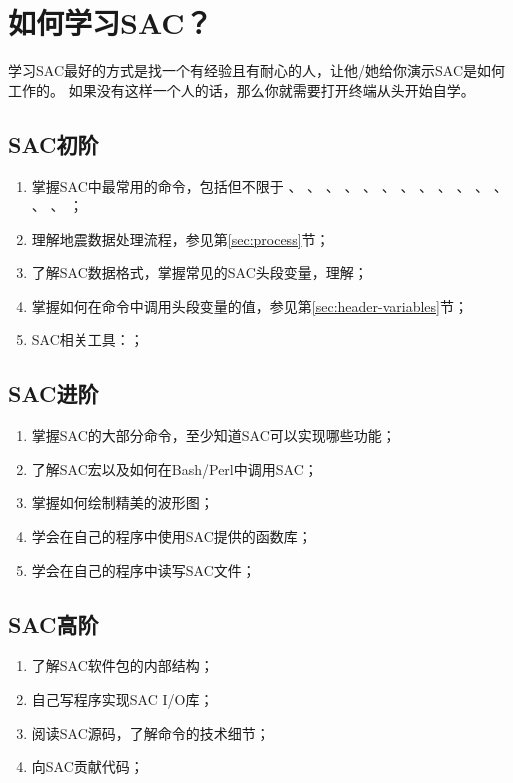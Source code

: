\section{如何学习SAC？}
学习SAC最好的方式是找一个有经验且有耐心的人，让他/她给你演示SAC是如何工作的。
如果没有这样一个人的话，那么你就需要打开终端从头开始自学。

\subsection{SAC初阶}
\begin{enumerate}
    \item 掌握SAC中最常用的命令，包括但不限于
            、
            、
            、
            、
            、
            、
            、
            、
            、
            、
            、
            、
            、
            、
            ；
        \item 理解地震数据处理流程，参见第\ref{sec:process}节；
        \item 了解SAC数据格式，掌握常见的SAC头段变量，理解；
        \item 掌握如何在命令中调用头段变量的值，参见第\ref{sec:header-variables}节；
        \item SAC相关工具：；
\end{enumerate}

\subsection{SAC进阶}
\begin{enumerate}
\item 掌握SAC的大部分命令，至少知道SAC可以实现哪些功能；
\item 了解SAC宏以及如何在Bash/Perl中调用SAC；
\item 掌握如何绘制精美的波形图；
\item 学会在自己的程序中使用SAC提供的函数库；
\item 学会在自己的程序中读写SAC文件；
\end{enumerate}

\subsection{SAC高阶}
\begin{enumerate}
\item 了解SAC软件包的内部结构；
\item 自己写程序实现SAC I/O库；
\item 阅读SAC源码，了解命令的技术细节；
\item 向SAC贡献代码；
\end{enumerate}
